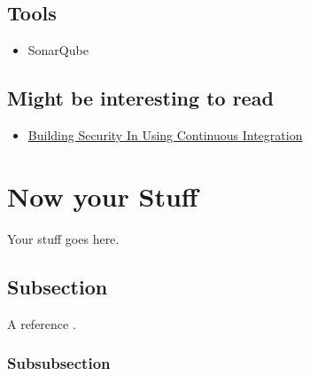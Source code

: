 \documentclass[a4paper,conference]{IEEEtran}
\begin{document}
\subsection{Tools}
\begin{itemize}
	\item SonarQube
\end{itemize}

\subsection{Might be interesting to read}
\begin{itemize}
	\item \href{http://www.crosstalkonline.org/storage/issue-archives/2010/201003/201003-Stiehm.pdf}{Building Security In Using Continuous Integration}
\end{itemize}




\section{Now your Stuff}
Your stuff goes here.

\subsection{Subsection}
A reference \cite{Akyildiz2002}.

\subsubsection{Subsubsection}



%


%
\end{document}
